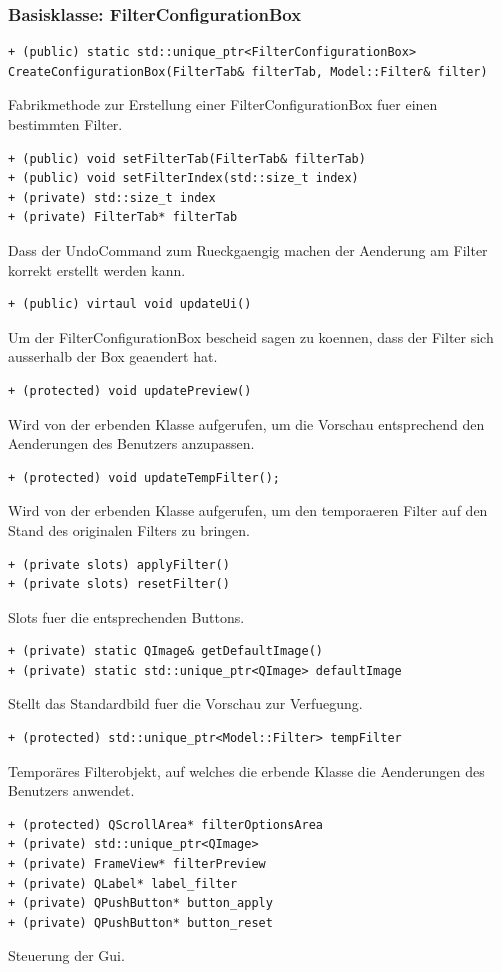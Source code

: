 \documentclass{scrartcl}
\begin{document}
{\subsubsection{Basisklasse: FilterConfigurationBox}
\bigskip
\begin{verbatim}
+ (public) static std::unique_ptr<FilterConfigurationBox>
CreateConfigurationBox(FilterTab& filterTab, Model::Filter& filter)
\end{verbatim}
Fabrikmethode zur Erstellung einer FilterConfigurationBox fuer einen bestimmten Filter.
\bigskip
\begin{verbatim}
+ (public) void setFilterTab(FilterTab& filterTab)
+ (public) void setFilterIndex(std::size_t index)
+ (private) std::size_t index
+ (private) FilterTab* filterTab
\end{verbatim}
Dass der UndoCommand zum Rueckgaengig machen der Aenderung am Filter korrekt erstellt werden kann.
\bigskip
\begin{verbatim}
+ (public) virtaul void updateUi()
\end{verbatim}
Um der FilterConfigurationBox bescheid sagen zu koennen, dass der Filter sich ausserhalb der Box geaendert hat.
\bigskip
\begin{verbatim}
+ (protected) void updatePreview()
\end{verbatim}
Wird von der erbenden Klasse aufgerufen, um die Vorschau entsprechend den Aenderungen des Benutzers anzupassen.
\bigskip
\begin{verbatim}
+ (protected) void updateTempFilter();
\end{verbatim}
Wird von der erbenden Klasse aufgerufen, um den temporaeren Filter auf den Stand des originalen Filters zu bringen.
\bigskip
\begin{verbatim}
+ (private slots) applyFilter()
+ (private slots) resetFilter()
\end{verbatim}
Slots fuer die entsprechenden Buttons.
\bigskip
\begin{verbatim}
+ (private) static QImage& getDefaultImage()
+ (private) static std::unique_ptr<QImage> defaultImage
\end{verbatim}
Stellt das Standardbild fuer die Vorschau zur Verfuegung.
\bigskip
\begin{verbatim}
+ (protected) std::unique_ptr<Model::Filter> tempFilter
\end{verbatim}
Temporäres Filterobjekt, auf welches die erbende Klasse die Aenderungen des Benutzers anwendet.
\bigskip
\begin{verbatim}
+ (protected) QScrollArea* filterOptionsArea
+ (private) std::unique_ptr<QImage>
+ (private) FrameView* filterPreview
+ (private) QLabel* label_filter
+ (private) QPushButton* button_apply
+ (private) QPushButton* button_reset
\end{verbatim}
Steuerung der Gui.
\bigskip
}
\end{document}
